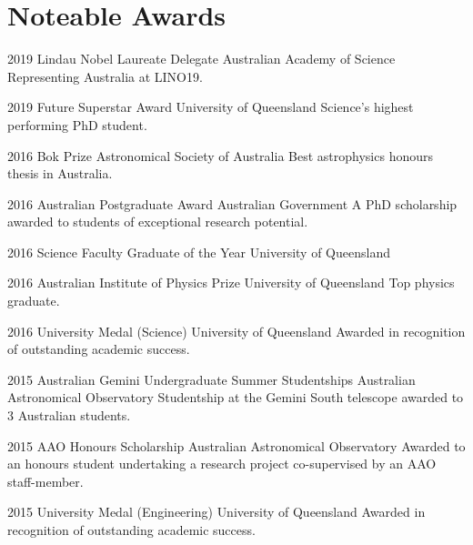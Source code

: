 \documentclass[]{friggeri-cv} %
\begin{document}
\section{Noteable Awards}
\begin{entrylist}
	\entryInline
	{2019} %
	{Lindau Nobel Laureate Delegate}
	{Australian Academy of Science}
	{Representing Australia at LINO19.}
\end{entrylist}
\begin{entrylist}
	\entryInline
	{2019} %
	{Future Superstar Award}
	{University of Queensland}
	{Science's highest performing PhD student.}
\end{entrylist}
\begin{entrylist}
	\entryInline
	{2016} %
	{Bok Prize}
	{Astronomical Society of Australia}
	{Best astrophysics honours thesis in Australia.}
\end{entrylist}
\begin{entrylist}
	\entryInlineSmall
	{2016} %
	{Australian Postgraduate Award}
	{Australian Government}
	{A PhD scholarship awarded to students of exceptional research potential.}
\end{entrylist}
\begin{entrylist}
	\entryInlineSmall
	{2016} %
	{Science Faculty Graduate of the Year}
	{University of Queensland}
	{}
\end{entrylist}
\begin{entrylist}
	\entryInline
	{2016} %
	{Australian Institute of Physics Prize}
	{University of Queensland}
	{Top physics graduate.}
\end{entrylist}
\begin{entrylist}
	\entryInlineSmall
	{2016} %
	{University Medal (Science)}
	{University of Queensland}
	{Awarded in recognition of outstanding academic success.}
\end{entrylist}
\begin{entrylist}
	\entryInlineSmall
	{2015} %
	{Australian Gemini Undergraduate Summer Studentships}
	{Australian Astronomical Observatory}
	{Studentship at the Gemini South telescope awarded to 3 Australian students.}
\end{entrylist}
\begin{entrylist}
	\entryInlineSmall
	{2015} %
	{AAO Honours Scholarship}
	{Australian Astronomical Observatory}
	{Awarded to an honours student undertaking a research project co-supervised by an AAO staff-member.}
\end{entrylist}
\begin{entrylist}
	\entryInlineSmall
	{2015} %
	{University Medal (Engineering)}
	{University of Queensland}
	{Awarded in recognition of outstanding academic success.}
\end{entrylist}
\end{document}
